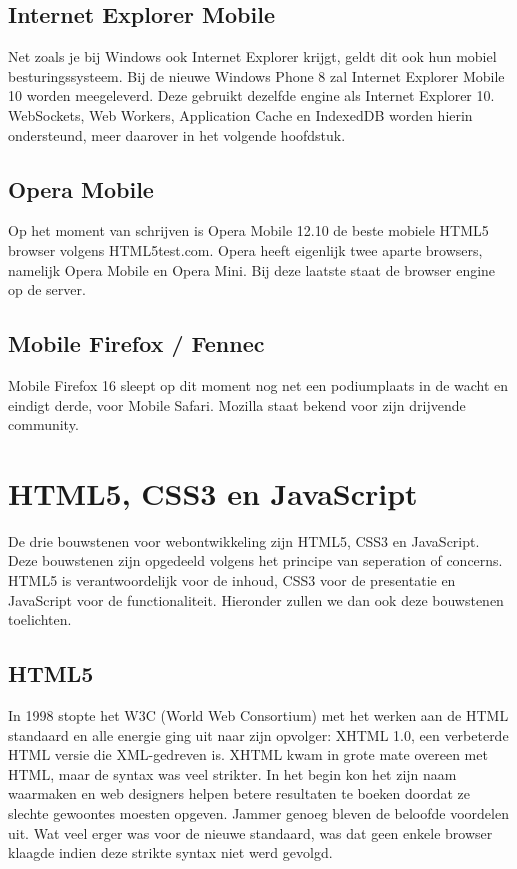 \subsection{Internet Explorer Mobile}
Net zoals je bij Windows ook Internet Explorer krijgt, geldt dit ook hun mobiel  besturingssysteem. Bij de nieuwe Windows Phone 8 zal Internet Explorer Mobile 10 worden meegeleverd. Deze gebruikt dezelfde engine als Internet Explorer 10. WebSockets, Web Workers, Application Cache en IndexedDB worden hierin ondersteund, meer daarover in het volgende hoofdstuk.

\subsection{Opera Mobile}
Op het moment van schrijven is Opera Mobile 12.10 de beste mobiele HTML5 browser volgens HTML5test.com. Opera heeft eigenlijk twee aparte browsers, namelijk Opera Mobile en Opera Mini. Bij deze laatste staat de browser engine op de server.

\subsection{Mobile Firefox / Fennec}
Mobile Firefox 16 sleept op dit moment nog net een podiumplaats in de wacht en eindigt derde, voor Mobile Safari. Mozilla staat bekend voor zijn drijvende community. 


\section{HTML5, CSS3 en JavaScript}
De drie bouwstenen voor webontwikkeling zijn HTML5, CSS3 en JavaScript. Deze bouwstenen zijn opgedeeld volgens het principe van seperation of concerns. HTML5 is verantwoordelijk voor de inhoud, CSS3 voor de presentatie en JavaScript voor de functionaliteit. Hieronder zullen we dan ook deze bouwstenen toelichten.

\subsection{HTML5}
In 1998 stopte het W3C (World Web Consortium) met het werken aan de HTML standaard en alle energie ging uit naar zijn opvolger: XHTML 1.0, een verbeterde HTML versie die XML-gedreven is. XHTML kwam in grote mate overeen met HTML, maar de syntax was veel strikter. In het begin kon het zijn naam waarmaken en web designers helpen betere resultaten te boeken doordat ze slechte gewoontes moesten opgeven. Jammer genoeg bleven de beloofde voordelen uit. Wat veel erger was voor de nieuwe standaard, was dat geen enkele browser klaagde indien deze strikte syntax niet werd gevolgd.

